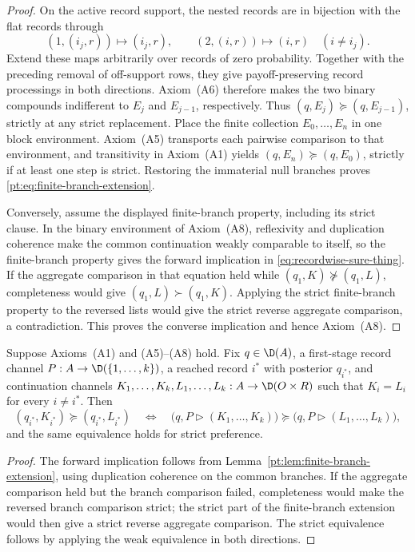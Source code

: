 \begin{proof}
On the active record support, the nested records are in bijection with the
flat records through
\[
 (1,(i_j,r))\longmapsto(i_j,r),
 \qquad
 (2,(i,r))\longmapsto(i,r)\quad(i\ne i_j).
\]
Extend these maps arbitrarily over records of zero probability.  Together
with the preceding removal of off-support rows, they give payoff-preserving
record processings in both directions.  Axiom~\textup{(A6)} therefore
makes the two binary compounds indifferent to $E_j$ and $E_{j-1}$, respectively.  Thus
$(q,E_j)\succeq(q,E_{j-1})$, strictly at any strict replacement.  Place the finite collection
$E_0,\ldots,E_n$ in one block environment.  Axiom~\textup{(A5)} transports each pairwise comparison to that
environment, and transitivity in Axiom~\textup{(A1)} yields $(q,E_n)\succeq(q,E_0)$, strictly if at least one
step is strict.  Restoring the immaterial null branches proves \eqref{pt:eq:finite-branch-extension}.

Conversely, assume the displayed finite-branch property, including its strict clause.  In the binary environment
of Axiom~\textup{(A8)}, reflexivity and duplication coherence make the common continuation weakly comparable to
itself, so the finite-branch property gives the forward implication in
\eqref{eq:recordwise-sure-thing}.  If the aggregate comparison in that equation held while
$(q_1,K)\not\succeq(q_1,L)$, completeness would give $(q_1,L)\succ(q_1,K)$.  Applying the strict
finite-branch property to the reversed lists would give the strict reverse aggregate comparison, a contradiction.  This
proves the converse implication and hence Axiom~\textup{(A8)}.
\end{proof}

\begin{corollary}\label{pt:cor:one-branch-a8}
Suppose Axioms~\textup{(A1)} and \textup{(A5)--(A8)} hold.  Fix $q\in\D(A)$, a first-stage record channel
$P:A\to\D(\{1,\ldots,k\})$, a reached record $i^*$ with posterior $q_{i^*}$, and continuation channels
$K_1,\ldots,K_k,L_1,\ldots,L_k:A\to\D(O\times R)$ such that $K_i=L_i$ for every $i\ne i^*$.  Then
\[
 (q_{i^*},K_{i^*})\succeq(q_{i^*},L_{i^*})
 \quad\Longleftrightarrow\quad
 \bigl(q,P\triangleright(K_1,\ldots,K_k)\bigr)
 \succeq
 \bigl(q,P\triangleright(L_1,\ldots,L_k)\bigr),
\]
and the same equivalence holds for strict preference.
\end{corollary}

\begin{proof}
The forward implication follows from Lemma~\ref{pt:lem:finite-branch-extension}, using duplication coherence on
the common branches.  If the aggregate comparison held but the branch comparison failed, completeness would make
the reversed branch comparison strict; the strict part of the finite-branch extension would then give a strict
reverse aggregate comparison.  The strict equivalence follows by applying the weak equivalence in both directions.
\end{proof}

